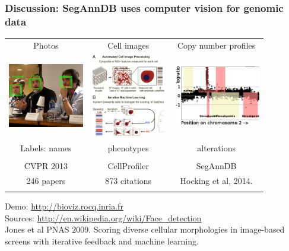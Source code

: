\documentclass{beamer}
\begin{document}
\begin{frame}
  \frametitle{Discussion: SegAnnDB uses computer vision for genomic data}
  \begin{tabular}{ccc}
    Photos & Cell images & Copy number profiles \\
    \includegraphics[width=1.3in]{faces} &
    \includegraphics[width=1.3in]{cellprofiler} &
    \includegraphics[width=1.5in]{regions-axes}\\
    Labels: names & phenotypes & alterations \\ \\
    CVPR 2013 & CellProfiler & SegAnnDB \\
    246 papers & 873 citations & Hocking et al, 2014. \\
    &
  \end{tabular}
  Demo: \url{http://bioviz.rocq.inria.fr}\\
  Sources: \url{http://en.wikipedia.org/wiki/Face_detection}\\
  Jones et al PNAS 2009. Scoring diverse cellular morphologies in
  image-based screens with iterative feedback and machine learning.
\end{frame}
\end{document}
